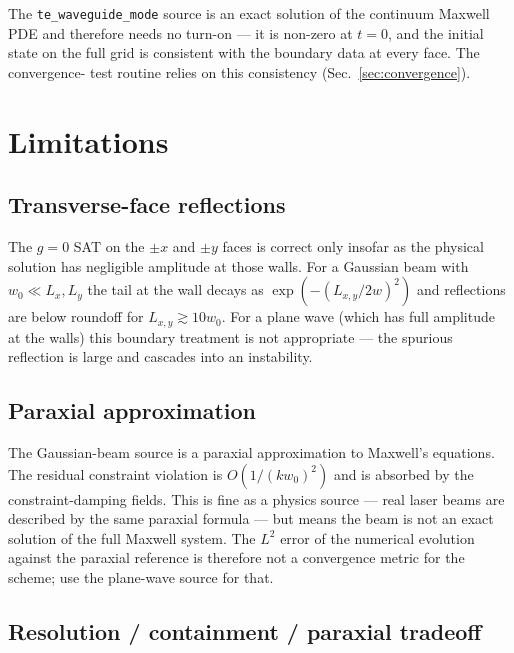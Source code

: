 \documentclass[11pt]{article}
\begin{document}
The \texttt{te\_waveguide\_mode} source is an exact solution of the
continuum Maxwell PDE and therefore needs no turn-on — it is
non-zero at $t = 0$, and the initial state on the full grid is
consistent with the boundary data at every face. The convergence-
test routine relies on this consistency (Sec.~\ref{sec:convergence}).

\section{Limitations}
\label{sec:limitations}

\subsection{Transverse-face reflections}

The $g = 0$ SAT on the $\pm x$ and $\pm y$ faces is correct only insofar
as the physical solution has negligible amplitude at those walls. For a
Gaussian beam with $w_0 \ll L_x, L_y$ the tail at the wall decays as
$\exp(-(L_{x,y} / 2 w)^2)$ and reflections are below roundoff for
$L_{x,y} \gtrsim 10 w_0$. For a plane wave (which has full amplitude at
the walls) this boundary treatment is not appropriate — the spurious
reflection is large and cascades into an instability.

\subsection{Paraxial approximation}

The Gaussian-beam source is a paraxial approximation to Maxwell's
equations. The residual constraint violation is $O(1/(k w_0)^2)$ and is
absorbed by the constraint-damping fields. This is fine as a physics
source — real laser beams are described by the same paraxial formula —
but means the beam is not an exact solution of the full Maxwell system.
The $L^2$ error of the numerical evolution against the paraxial
reference is therefore not a convergence metric for the scheme; use the
plane-wave source for that.

\subsection{Resolution / containment / paraxial tradeoff}
\end{document}
